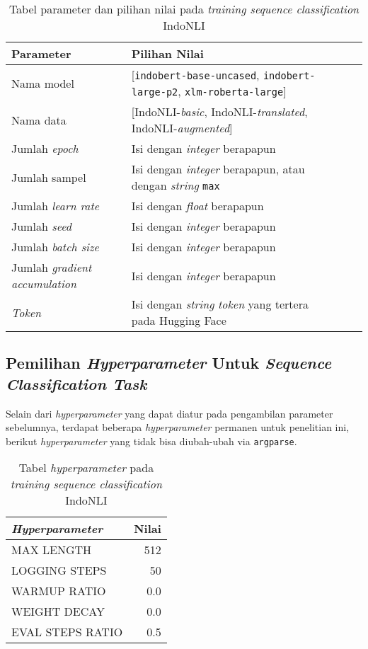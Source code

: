 \begin{table}[H]
\centering
\begin{tabularx}{\linewidth}{XlXX}
 \toprule
 Parameter & Pilihan Nilai \\
 \midrule
 Nama model & [\texttt{indobert-base-uncased}, \texttt{indobert-large-p2}, \texttt{xlm-roberta-large}] \\  
 Nama data & [IndoNLI-\emph{basic}, IndoNLI-\emph{translated}, IndoNLI-\emph{augmented}] \\
 Jumlah \emph{epoch} & Isi dengan \emph{integer} berapapun \\
 Jumlah sampel & Isi dengan \emph{integer} berapapun, atau dengan \emph{string} \texttt{max} \\
 Jumlah \emph{learn rate} & Isi dengan \emph{float} berapapun \\ 
 Jumlah \emph{seed} & Isi dengan \emph{integer} berapapun \\ 
 Jumlah \emph{batch size} & Isi dengan \emph{integer} berapapun \\ 
 Jumlah \emph{gradient accumulation} & Isi dengan \emph{integer} berapapun \\ 
 \emph{Token} & Isi dengan \emph{string} \emph{token} yang tertera pada Hugging Face \\ 
 \bottomrule
\end{tabularx}
\caption{Tabel parameter dan pilihan nilai pada \emph{training sequence classification} IndoNLI}
\end{table}

\subsection{Pemilihan \emph{Hyperparameter} Untuk \emph{Sequence Classification Task}}
\label{4.1.2}
Selain dari \emph{hyperparameter} yang dapat diatur pada pengambilan parameter sebelumnya, terdapat beberapa \emph{hyperparameter} permanen untuk penelitian ini, berikut \emph{hyperparameter} yang tidak bisa diubah-ubah via \texttt{argparse}.

\begin{table}[h]
\centering
\begin{tabular}{lr} 
 \toprule
 \emph{Hyperparameter} & Nilai \\ [0.5ex] 
 \midrule
 MAX LENGTH & 512 \\ 
 LOGGING STEPS & 50 \\
 WARMUP RATIO & 0.0 \\
 WEIGHT DECAY & 0.0 \\ 
 EVAL STEPS RATIO & 0.5 \\ [1ex] 
 \bottomrule
\end{tabular}
\caption{Tabel \emph{hyperparameter} pada \emph{training sequence classification} IndoNLI}
\end{table}

